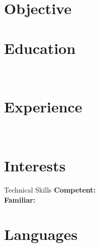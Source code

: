 \documentclass[margin]{res}
\begin{document}
\correspondence

\begin{resume}

	\section{Objective}{\objective}
	\section{Education}{\educations\\[-40pt]}
	\section{Experience}{\experiences\\[-40pt]}
	\section{Interests}{\interests}
	\begin{section}{Technical Skills}
		\textbf{Competent:} \competentskills\\
		\textbf{Familiar:} \familiarskills
	\end{section}
	\section{Languages}{\languages}

\end{resume} 
\end{document}
